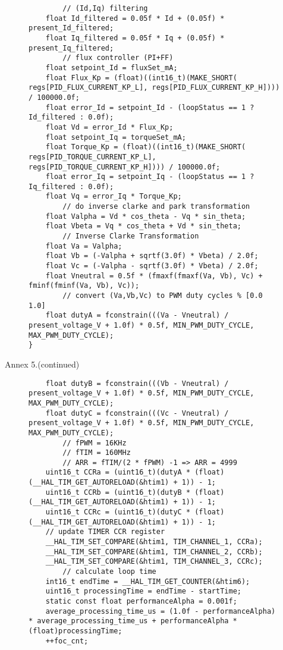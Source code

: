 \begin{figure}[H]
	\centering
	\begin{verbatim}
		// (Id,Iq) filtering
	float Id_filtered = 0.05f * Id + (0.05f) * present_Id_filtered;
    float Iq_filtered = 0.05f * Iq + (0.05f) * present_Iq_filtered;
    	// flux controller (PI+FF)
    float setpoint_Id = fluxSet_mA;
    float Flux_Kp = (float)((int16_t)(MAKE_SHORT( regs[PID_FLUX_CURRENT_KP_L], regs[PID_FLUX_CURRENT_KP_H]))) / 100000.0f;
    float error_Id = setpoint_Id - (loopStatus == 1 ? Id_filtered : 0.0f);
    float Vd = error_Id * Flux_Kp;
    float setpoint_Iq = torqueSet_mA;
    float Torque_Kp = (float)((int16_t)(MAKE_SHORT( regs[PID_TORQUE_CURRENT_KP_L], regs[PID_TORQUE_CURRENT_KP_H]))) / 100000.0f;
    float error_Iq = setpoint_Iq - (loopStatus == 1 ? Iq_filtered : 0.0f);
    float Vq = error_Iq * Torque_Kp;
		// do inverse clarke and park transformation
    float Valpha = Vd * cos_theta - Vq * sin_theta;
    float Vbeta = Vq * cos_theta + Vd * sin_theta;
        // Inverse Clarke Transformation
    float Va = Valpha;
    float Vb = (-Valpha + sqrtf(3.0f) * Vbeta) / 2.0f;
    float Vc = (-Valpha - sqrtf(3.0f) * Vbeta) / 2.0f;
    float Vneutral = 0.5f * (fmaxf(fmaxf(Va, Vb), Vc) + fminf(fminf(Va, Vb), Vc));
    	// convert (Va,Vb,Vc) to PWM duty cycles % [0.0 1.0]
	float dutyA = fconstrain(((Va - Vneutral) / present_voltage_V + 1.0f) * 0.5f, MIN_PWM_DUTY_CYCLE, MAX_PWM_DUTY_CYCLE);
}	\end{verbatim}
\end{figure}
\newpage
\hfill \large Annex 5.(continued)

\begin{figure}[H]
	\centering
	\begin{verbatim}
    float dutyB = fconstrain(((Vb - Vneutral) / present_voltage_V + 1.0f) * 0.5f, MIN_PWM_DUTY_CYCLE, MAX_PWM_DUTY_CYCLE);
    float dutyC = fconstrain(((Vc - Vneutral) / present_voltage_V + 1.0f) * 0.5f, MIN_PWM_DUTY_CYCLE, MAX_PWM_DUTY_CYCLE);
        // fPWM = 16KHz
        // fTIM = 160MHz
        // ARR = fTIM/(2 * fPWM) -1 => ARR = 4999
    uint16_t CCRa = (uint16_t)(dutyA * (float)(__HAL_TIM_GET_AUTORELOAD(&htim1) + 1)) - 1;
    uint16_t CCRb = (uint16_t)(dutyB * (float)(__HAL_TIM_GET_AUTORELOAD(&htim1) + 1)) - 1;
    uint16_t CCRc = (uint16_t)(dutyC * (float)(__HAL_TIM_GET_AUTORELOAD(&htim1) + 1)) - 1;
    // update TIMER CCR register
    __HAL_TIM_SET_COMPARE(&htim1, TIM_CHANNEL_1, CCRa);
    __HAL_TIM_SET_COMPARE(&htim1, TIM_CHANNEL_2, CCRb);
    __HAL_TIM_SET_COMPARE(&htim1, TIM_CHANNEL_3, CCRc);
		// calculate loop time
    int16_t endTime = __HAL_TIM_GET_COUNTER(&htim6);
    uint16_t processingTime = endTime - startTime;
    static const float performanceAlpha = 0.001f;
    average_processing_time_us = (1.0f - performanceAlpha) * average_processing_time_us + performanceAlpha * (float)processingTime;
    ++foc_cnt;
	\end{verbatim}
\end{figure}

